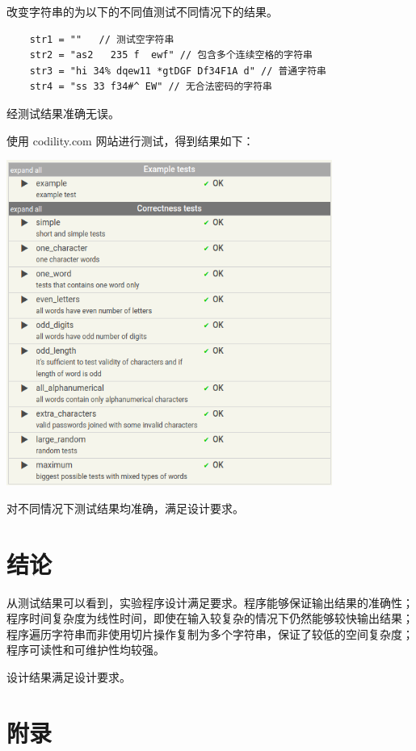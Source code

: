 \begin{spacing}{1.5}
    改变字符串的为以下的不同值测试不同情况下的结果。

\begin{lstlisting}
    str1 = ""   // 测试空字符串
    str2 = "as2   235 f  ewf" // 包含多个连续空格的字符串
    str3 = "hi 34% dqew11 *gtDGF Df34F1A d" // 普通字符串
    str4 = "ss 33 f34#^ EW" // 无合法密码的字符串
\end{lstlisting}

    经测试结果准确无误。

    使用 codility.com 网站进行测试，得到结果如下：

\begin{center}
\includegraphics[width=0.8\textwidth]{./test_result.png}
\end{center}

    对不同情况下测试结果均准确，满足设计要求。

    \section{结论}
    从测试结果可以看到，实验程序设计满足要求。程序能够保证输出结果的准确性；程序时间复杂度为线性时间，即使在输入较复杂的情况下仍然能够较快输出结果；程序遍历字符串而非使用切片操作复制为多个字符串，保证了较低的空间复杂度；程序可读性和可维护性均较强。

    设计结果满足设计要求。

    \section{附录}

\end{spacing}
